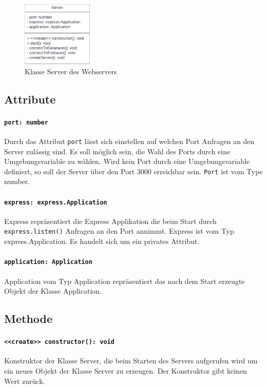 \documentclass{entwurfsheft}
\begin{document}
\begin{figure}[htp]
    \centering
    \includegraphics[width = 0.3\textwidth]{images/webserver/server.pdf}
    \caption{Klasse Server des Webservers}
    \label{fig:server}
\end{figure}

\subsection*{Attribute}
\paragraph{\texttt{port: number}}
Durch das Attribut \texttt{port} lässt sich einstellen auf welchen Port Anfragen an den Server zulässig sind. Es soll möglich sein, die Wahl des Ports durch eine Umgebungsvariable zu wählen. Wird kein Port durch eine Umgebungsvariable definiert, so soll der Server über den Port 3000 erreichbar sein.
\texttt{Port} ist vom Type number.
\paragraph{\texttt{express: express.Application}}
Express repräsentiert die Express Applikation die beim Start durch \texttt{express.listen()} Anfragen an den Port annimmt.
Express ist vom Typ express.Application. Es handelt sich um ein privates Attribut.
\paragraph{\texttt{application: Application}}
Application vom Typ Application repräsentiert das nach dem Start erzeugte Objekt der Klasse Application.

\subsection*{Methode}
\paragraph{\texttt{<<create>> constructor(): void}}
Konstruktor der Klasse Server, die beim Starten des Servers aufgerufen wird um ein neues Objekt der Klasse Server zu erzeugen. Der Konstruktor gibt keinen Wert zurück.
\end{document}
